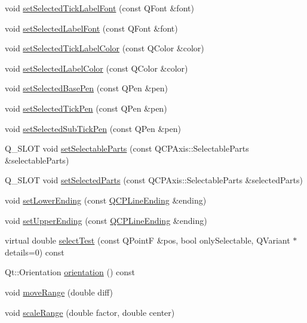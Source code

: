 \begin{DoxyCompactItemize}
\item 
void \hyperlink{class_q_c_p_axis_a845ccb560b7bc5281098a5be494145f6}{set\+Selected\+Tick\+Label\+Font} (const Q\+Font \&font)
\item 
void \hyperlink{class_q_c_p_axis_a02ec2a75d4d8401eaab834fbc6803d30}{set\+Selected\+Label\+Font} (const Q\+Font \&font)
\item 
void \hyperlink{class_q_c_p_axis_a9bdbf5e63ab15187f3a1de9440129227}{set\+Selected\+Tick\+Label\+Color} (const Q\+Color \&color)
\item 
void \hyperlink{class_q_c_p_axis_a5d502dec597c634f491fdd73d151c72d}{set\+Selected\+Label\+Color} (const Q\+Color \&color)
\item 
void \hyperlink{class_q_c_p_axis_aeb917a909215605b95ef2be843de1ee8}{set\+Selected\+Base\+Pen} (const Q\+Pen \&pen)
\item 
void \hyperlink{class_q_c_p_axis_a8360502685eb782edbf04019c9345cdc}{set\+Selected\+Tick\+Pen} (const Q\+Pen \&pen)
\item 
void \hyperlink{class_q_c_p_axis_a2a00a7166600155eac26843132eb9576}{set\+Selected\+Sub\+Tick\+Pen} (const Q\+Pen \&pen)
\item 
Q\+\_\+\+S\+L\+OT void \hyperlink{class_q_c_p_axis_a513f9b9e326c505d9bec54880031b085}{set\+Selectable\+Parts} (const Q\+C\+P\+Axis\+::\+Selectable\+Parts \&selectable\+Parts)
\item 
Q\+\_\+\+S\+L\+OT void \hyperlink{class_q_c_p_axis_ab9d7a69277dcbed9119b3c1f25ca19c3}{set\+Selected\+Parts} (const Q\+C\+P\+Axis\+::\+Selectable\+Parts \&selected\+Parts)
\item 
void \hyperlink{class_q_c_p_axis_a08af1c72db9ae4dc8cb8a973d44405ab}{set\+Lower\+Ending} (const \hyperlink{class_q_c_p_line_ending}{Q\+C\+P\+Line\+Ending} \&ending)
\item 
void \hyperlink{class_q_c_p_axis_a69119b892fc306f651763596685aa377}{set\+Upper\+Ending} (const \hyperlink{class_q_c_p_line_ending}{Q\+C\+P\+Line\+Ending} \&ending)
\item 
virtual double \hyperlink{class_q_c_p_axis_a2877a6230920c118be65c6113089f467}{select\+Test} (const Q\+PointF \&pos, bool only\+Selectable, Q\+Variant $\ast$details=0) const 
\item 
Qt\+::\+Orientation \hyperlink{class_q_c_p_axis_a57483f2f60145ddc9e63f3af53959265}{orientation} () const 
\item 
void \hyperlink{class_q_c_p_axis_a18f3a68f2b691af1fd34b6593c886630}{move\+Range} (double diff)
\item 
void \hyperlink{class_q_c_p_axis_a7072ff96fe690148f1bbcdb4f773ea1c}{scale\+Range} (double factor, double center)

\end{DoxyCompactItemize}
